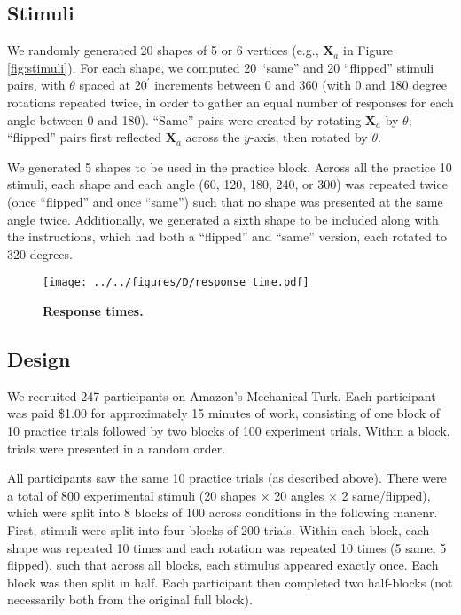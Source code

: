 \documentclass[10pt,letterpaper]{article}
\newcommand{\Xa}[0]{\mathbf{X}_a}
\begin{document}
\subsection{Stimuli}

We randomly generated 20 shapes of 5 or 6 vertices (e.g., $\Xa$ in
Figure \ref{fig:stimuli}). For each shape, we computed 20 ``same'' and
20 ``flipped'' stimuli pairs, with $\theta$ spaced at $20^\prime$
increments between 0 and 360 (with 0 and 180 degree rotations repeated
twice, in order to gather an equal number of responses for each angle
between 0 and 180). ``Same'' pairs were created by rotating $\Xa$ by
$\theta$; ``flipped'' pairs first reflected $\Xa$ across the $y$-axis,
then rotated by $\theta$.

We generated 5 shapes to be used in the practice block. Across all the
practice 10 stimuli, each shape and each angle (60, 120, 180, 240, or
300) was repeated twice (once ``flipped'' and once ``same'') such that
no shape was presented at the same angle twice. Additionally, we
generated a sixth shape to be included along with the instructions,
which had both a ``flipped'' and ``same'' version, each rotated to 320
degrees.

\begin{figure*}[t]
  \begin{center}
    \texttt{[image: ../../figures/D/response\_time.pdf]}
    \caption{\textbf{Response times.}}
    \label{fig:response-times}
  \end{center}
\end{figure*}


\subsection{Design}

We recruited 247 participants on Amazon's Mechanical Turk. Each
participant was paid \$1.00 for approximately 15 minutes of work,
consisting of one block of 10 practice trials followed by two blocks
of 100 experiment trials. Within a block, trials were presented in a
random order.

All participants saw the same 10 practice trials (as described
above). There were a total of 800 experimental stimuli (20 shapes
$\times$ 20 angles $\times$ 2 same/flipped), which were split into 8
blocks of 100 across conditions in the following manenr. First,
stimuli were split into four blocks of 200 trials. Within each block,
each shape was repeated 10 times and each rotation was repeated 10
times (5 same, 5 flipped), such that across all blocks, each stimulus
appeared exactly once. Each block was then split in half. Each
participant then completed two half-blocks (not necessarily both from
the original full block).
\end{document}
